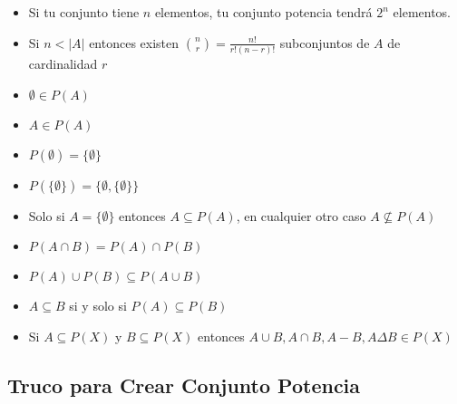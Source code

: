 \documentclass[12pt, fleqn]{report}                             %
\theoremstyle{break}                                            %
\begin{document}
                \begin{itemize}
                    \item Si tu conjunto tiene $n$ elementos, tu conjunto potencia tendrá
                        $2^n$ elementos.

                    \item Si $n < |A|$ entonces existen $\binom{n}{r} = \frac{n!}{r!(n-r)!}$ 
                        subconjuntos de $A$ de cardinalidad $r$

                    \item $\emptyset \in P(A)$

                    \item $A \in P(A)$

                    \item $P(\emptyset) = \{\emptyset\}$

                    \item $P( \{\emptyset\}) = \{\emptyset, \{\emptyset\} \}$

                    \item Solo si $A = \{\emptyset\}$ entonces $A \subseteq P(A)$,
                        en cualquier otro caso $A \nsubseteq P(A)$

                    \item $P(A \cap B) = P(A) \cap P(B)$

                    \item $P(A) \cup P(B) \subseteq P(A \cup B)$

                    \item $A \subseteq B$ si y solo si  $P(A) \subseteq P(B)$ 

                    \item Si $A \subseteq P(X)$ y $B \subseteq P(X)$ entonces 
                    $A \cup B, A \cap B,  A - B,  A \Delta B \in P(X)$

                \end{itemize}



            \clearpage
            \subsection{Truco para Crear Conjunto Potencia}
\end{document}

